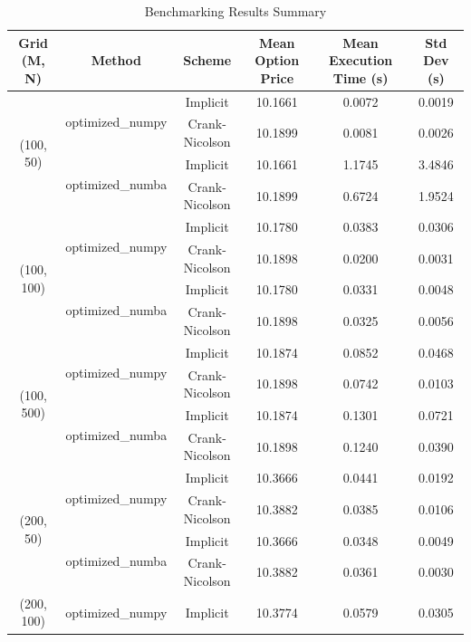 \documentclass[12pt,a4paper]{report}
\begin{document}
\begin{landscape}  %
\begin{table}[h!]
    \centering
    \caption{Benchmarking Results Summary}
    \begin{tabular}{|c|c|c|c|c|c|}
        \hline
        \textbf{Grid (M, N)} & \textbf{Method} & \textbf{Scheme} & \textbf{Mean Option Price} & \textbf{Mean Execution Time (s)} & \textbf{Std Dev (s)} \\
        \hline
        \multirow{4}{*}{(100, 50)} & \multirow{2}{*}{optimized\_numpy} & Implicit & 10.1661 & 0.0072 & 0.0019 \\
         & & Crank-Nicolson & 10.1899 & 0.0081 & 0.0026 \\
         \cline{2-6}
         & \multirow{2}{*}{optimized\_numba} & Implicit & 10.1661 & 1.1745 & 3.4846 \\
         & & Crank-Nicolson & 10.1899 & 0.6724 & 1.9524 \\
        \hline
        \multirow{4}{*}{(100, 100)} & \multirow{2}{*}{optimized\_numpy} & Implicit & 10.1780 & 0.0383 & 0.0306 \\
         & & Crank-Nicolson & 10.1898 & 0.0200 & 0.0031 \\
         \cline{2-6}
         & \multirow{2}{*}{optimized\_numba} & Implicit & 10.1780 & 0.0331 & 0.0048 \\
         & & Crank-Nicolson & 10.1898 & 0.0325 & 0.0056 \\
        \hline
        \multirow{4}{*}{(100, 500)} & \multirow{2}{*}{optimized\_numpy} & Implicit & 10.1874 & 0.0852 & 0.0468 \\
         & & Crank-Nicolson & 10.1898 & 0.0742 & 0.0103 \\
         \cline{2-6}
         & \multirow{2}{*}{optimized\_numba} & Implicit & 10.1874 & 0.1301 & 0.0721 \\
         & & Crank-Nicolson & 10.1898 & 0.1240 & 0.0390 \\
        \hline
        \multirow{4}{*}{(200, 50)} & \multirow{2}{*}{optimized\_numpy} & Implicit & 10.3666 & 0.0441 & 0.0192 \\
         & & Crank-Nicolson & 10.3882 & 0.0385 & 0.0106 \\
         \cline{2-6}
         & \multirow{2}{*}{optimized\_numba} & Implicit & 10.3666 & 0.0348 & 0.0049 \\
         & & Crank-Nicolson & 10.3882 & 0.0361 & 0.0030 \\
        \hline
        \multirow{4}{*}{(200, 100)} & \multirow{2}{*}{optimized\_numpy} & Implicit & 10.3774 & 0.0579 & 0.0305 \\

\end{tabular}
\end{table}
\end{landscape}
\end{document}
